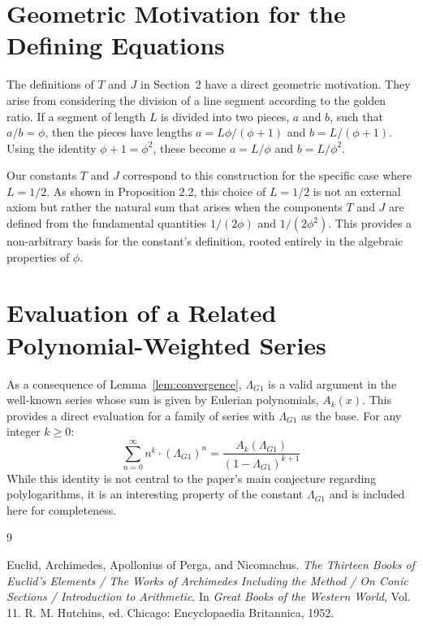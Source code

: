 \documentclass{amsart}
\theoremstyle{plain}
\theoremstyle{definition}
\theoremstyle{remark}
\newcommand{\LambdaG}{\Lambda_{G1}}
\begin{document}
\appendix
\section{Geometric Motivation for the Defining Equations}
\label{app:A}
The definitions of $T$ and $J$ in Section~2 have a direct geometric motivation. They arise from considering the division of a line segment according to the golden ratio. If a segment of length $L$ is divided into two pieces, $a$ and $b$, such that $a/b = \phi$, then the pieces have lengths $a = L\phi/(\phi+1)$ and $b=L/(\phi+1)$. Using the identity $\phi+1=\phi^2$, these become $a=L/\phi$ and $b=L/\phi^2$.

Our constants $T$ and $J$ correspond to this construction for the specific case where $L=1/2$. As shown in Proposition 2.2, this choice of $L=1/2$ is not an external axiom but rather the natural sum that arises when the components $T$ and $J$ are defined from the fundamental quantities $1/(2\phi)$ and $1/(2\phi^2)$. This provides a non-arbitrary basis for the constant's definition, rooted entirely in the algebraic properties of $\phi$.

\section{Evaluation of a Related Polynomial-Weighted Series}
As a consequence of Lemma~\ref{lem:convergence}, $\LambdaG$ is a valid argument in the well-known series whose sum is given by Eulerian polynomials, $A_k(x)$. This provides a direct evaluation for a family of series with $\LambdaG$ as the base. For any integer $k \ge 0$:
$$ \sum_{n=0}^{\infty} n^k \cdot (\LambdaG)^n = \frac{A_k(\LambdaG)}{(1-\LambdaG)^{k+1}} $$
While this identity is not central to the paper's main conjecture regarding polylogarithms, it is an interesting property of the constant $\LambdaG$ and is included here for completeness.

\begin{thebibliography}{9}

Euclid, Archimedes, Apollonius of Perga, and Nicomachus. 
\textit{The Thirteen Books of Euclid's Elements / The Works of Archimedes Including the Method / On Conic Sections / Introduction to Arithmetic}. 
In \textit{Great Books of the Western World}, Vol. 11. R. M. Hutchins, ed. Chicago: Encyclopaedia Britannica, 1952.

\end{thebibliography}
\end{document}
